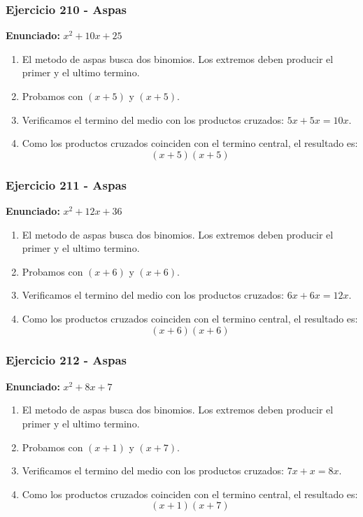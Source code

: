 \documentclass[11pt,a4paper]{article}
\begin{document}
\vspace{0.2cm}
\subsubsection*{Ejercicio 210 - Aspas}
\textbf{Enunciado:} $ x^{2} + 10 x + 25 $\par
\begin{enumerate}[leftmargin=2em]
\item El metodo de aspas busca dos binomios. Los extremos deben producir el primer y el ultimo termino.
\item Probamos con \((x + 5)\) y \((x + 5)\).
\item Verificamos el termino del medio con los productos cruzados: \(5 x+5 x=10 x\).
\item Como los productos cruzados coinciden con el termino central, el resultado es: \[\boxed{\left(x + 5\right)\left(x + 5\right)}\]
\end{enumerate}

\vspace{0.2cm}
\subsubsection*{Ejercicio 211 - Aspas}
\textbf{Enunciado:} $ x^{2} + 12 x + 36 $\par
\begin{enumerate}[leftmargin=2em]
\item El metodo de aspas busca dos binomios. Los extremos deben producir el primer y el ultimo termino.
\item Probamos con \((x + 6)\) y \((x + 6)\).
\item Verificamos el termino del medio con los productos cruzados: \(6 x+6 x=12 x\).
\item Como los productos cruzados coinciden con el termino central, el resultado es: \[\boxed{\left(x + 6\right)\left(x + 6\right)}\]
\end{enumerate}

\vspace{0.2cm}
\subsubsection*{Ejercicio 212 - Aspas}
\textbf{Enunciado:} $ x^{2} + 8 x + 7 $\par
\begin{enumerate}[leftmargin=2em]
\item El metodo de aspas busca dos binomios. Los extremos deben producir el primer y el ultimo termino.
\item Probamos con \((x + 1)\) y \((x + 7)\).
\item Verificamos el termino del medio con los productos cruzados: \(7 x+x=8 x\).
\item Como los productos cruzados coinciden con el termino central, el resultado es: \[\boxed{\left(x + 1\right)\left(x + 7\right)}\]
\end{enumerate}
\end{document}
